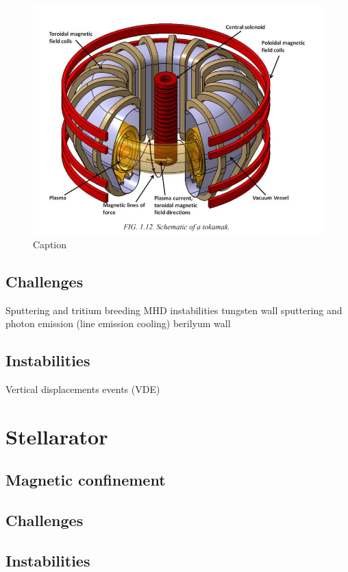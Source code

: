 \documentclass[smallextended]{svjour3}
\begin{document}
\begin{figure}[H]
    \centering
    \includegraphics[width=0.5\linewidth]{images/TokamaksSchematic.png}
    \caption{Caption}
    \label{fig:enter-label}
\end{figure}

\subsection{Challenges}

Sputtering and tritium breeding
MHD instabilities
tungsten wall sputtering and photon emission (line emission cooling)
berilyum wall

\subsection{Instabilities}

Vertical displacements events (VDE)

\section{Stellarator}

\subsection{Magnetic confinement}

\subsection{Challenges}

\subsection{Instabilities}

\newpage

\end{document}
